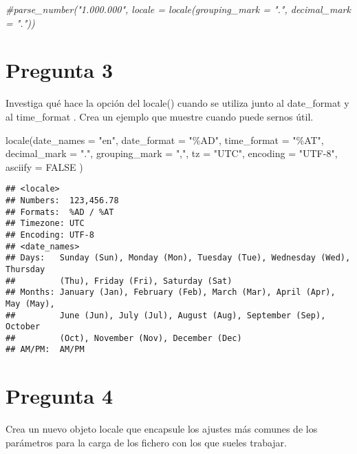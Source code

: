 \documentclass[
]{article}
\newenvironment{Shaded}{\begin{snugshade}}{\end{snugshade}}
\newcommand{\AttributeTok}[1]{\textcolor[rgb]{0.77,0.63,0.00}{#1}}
\newcommand{\CommentTok}[1]{\textcolor[rgb]{0.56,0.35,0.01}{\textit{#1}}}
\newcommand{\ConstantTok}[1]{\textcolor[rgb]{0.00,0.00,0.00}{#1}}
\newcommand{\FunctionTok}[1]{\textcolor[rgb]{0.00,0.00,0.00}{#1}}
\newcommand{\NormalTok}[1]{#1}
\newcommand{\StringTok}[1]{\textcolor[rgb]{0.31,0.60,0.02}{#1}}
\begin{document}
\begin{Shaded}
\begin{Highlighting}[]
\CommentTok{\#parse\_number("1.000.000", locale = locale(grouping\_mark = ".", decimal\_mark = "."))}
\end{Highlighting}
\end{Shaded}

\hypertarget{pregunta-3}{%
\section{Pregunta 3}\label{pregunta-3}}

Investiga qué hace la opción del locale() cuando se utiliza junto al
date\_format y al time\_format . Crea un ejemplo que muestre cuando
puede sernos útil.

\begin{Shaded}
\begin{Highlighting}[]
\FunctionTok{locale}\NormalTok{(}\AttributeTok{date\_names =} \StringTok{"en"}\NormalTok{,}
       \AttributeTok{date\_format =} \StringTok{"\%AD"}\NormalTok{,}
       \AttributeTok{time\_format =} \StringTok{"\%AT"}\NormalTok{,}
       \AttributeTok{decimal\_mark =} \StringTok{"."}\NormalTok{,}
       \AttributeTok{grouping\_mark =} \StringTok{","}\NormalTok{,}
       \AttributeTok{tz =} \StringTok{"UTC"}\NormalTok{,}
       \AttributeTok{encoding =} \StringTok{"UTF{-}8"}\NormalTok{,}
       \AttributeTok{asciify =} \ConstantTok{FALSE}
\NormalTok{)}
\end{Highlighting}
\end{Shaded}

\begin{verbatim}
## <locale>
## Numbers:  123,456.78
## Formats:  %AD / %AT
## Timezone: UTC
## Encoding: UTF-8
## <date_names>
## Days:   Sunday (Sun), Monday (Mon), Tuesday (Tue), Wednesday (Wed), Thursday
##         (Thu), Friday (Fri), Saturday (Sat)
## Months: January (Jan), February (Feb), March (Mar), April (Apr), May (May),
##         June (Jun), July (Jul), August (Aug), September (Sep), October
##         (Oct), November (Nov), December (Dec)
## AM/PM:  AM/PM
\end{verbatim}

\hypertarget{pregunta-4}{%
\section{Pregunta 4}\label{pregunta-4}}

Crea un nuevo objeto locale que encapsule los ajustes más comunes de los
parámetros para la carga de los fichero con los que sueles trabajar.
\end{document}
